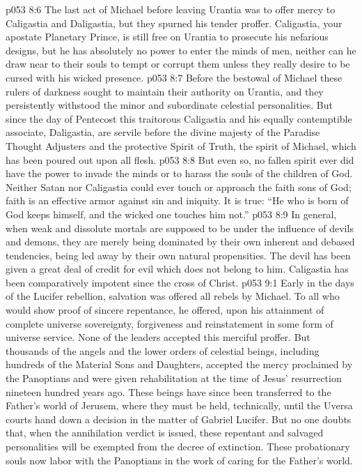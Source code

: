 \pc \vs p053 8:6 The last act of Michael before leaving Urantia was to offer mercy to Caligastia and Daligastia, but they spurned his tender proffer. Caligastia, your apostate Planetary Prince, is still free on Urantia to prosecute his nefarious designs, but he has absolutely no power to enter the minds of men, neither can he draw near to their souls to tempt or corrupt them unless they really desire to be cursed with his wicked presence.
\pc \vs p053 8:7 Before the bestowal of Michael these rulers of darkness sought to maintain their authority on Urantia, and they persistently withstood the minor and subordinate celestial personalities. But since the day of Pentecost this traitorous Caligastia and his equally contemptible associate, Daligastia, are servile before the divine majesty of the Paradise Thought Adjusters and the protective Spirit of Truth, the spirit of Michael, which has been poured out upon all flesh.
\vs p053 8:8 But even so, no fallen spirit ever did have the power to invade the minds or to harass the souls of the children of God. Neither Satan nor Caligastia could ever touch or approach the faith sons of God; faith is an effective armor against sin and iniquity. It is true: “He who is born of God keeps himself, and the wicked one touches him not.”
\vs p053 8:9 In general, when weak and dissolute mortals are supposed to be under the influence of devils and demons, they are merely being dominated by their own inherent and debased tendencies, being led away by their own natural propensities. The devil has been given a great deal of credit for evil which does not belong to him. Caligastia has been comparatively impotent since the cross of Christ.
\vs p053 9:1 Early in the days of the Lucifer rebellion, salvation was offered all rebels by Michael. To all who would show proof of sincere repentance, he offered, upon his attainment of complete universe sovereignty, forgiveness and reinstatement in some form of universe service. None of the leaders accepted this merciful proffer. But thousands of the angels and the lower orders of celestial beings, including hundreds of the Material Sons and Daughters, accepted the mercy proclaimed by the Panoptians and were given rehabilitation at the time of Jesus’ resurrection nineteen hundred years ago. These beings have since been transferred to the Father’s world of Jerusem, where they must be held, technically, until the Uversa courts hand down a decision in the matter of Gabriel  Lucifer. But no one doubts that, when the annihilation verdict is issued, these repentant and salvaged personalities will be exempted from the decree of extinction. These probationary souls now labor with the Panoptians in the work of caring for the Father’s world.

